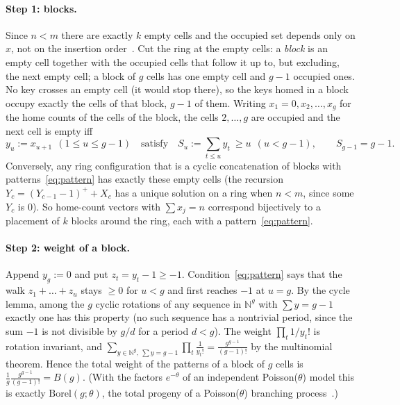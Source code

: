 \documentclass[11pt,a4paper]{article}
\theoremstyle{definition}
\theoremstyle{remark}
\newcommand{\N}{\mathbb{N}}
\begin{document}
\paragraph{Step 1: blocks.} Since $n<m$ there are exactly $k$ empty cells and the occupied set depends only on $x$, not on the insertion order~\cite{konheim1966}. Cut the ring at the empty cells: a \emph{block} is an empty cell together with the occupied cells that follow it up to, but excluding, the next empty cell; a block of $g$ cells has one empty cell and $g-1$ occupied ones. No key crosses an empty cell (it would stop there), so the keys homed in a block occupy exactly the cells of that block, $g-1$ of them. Writing $x_1=0,x_2,\dots,x_g$ for the home counts of the cells of the block, the cells $2,\dots,g$ are occupied and the next cell is empty iff
\begin{equation}\label{eq:pattern}
y_u:=x_{u+1}\ \ (1\le u\le g-1)\quad\text{satisfy}\quad S_u:=\sum_{t\le u}y_t\ \ge u\ \ (u<g-1),\qquad S_{g-1}=g-1 .
\end{equation}
Conversely, any ring configuration that is a cyclic concatenation of blocks with patterns~\eqref{eq:pattern} has exactly these empty cells (the recursion $Y_c=(Y_{c-1}-1)^++X_c$ has a unique solution on a ring when $n<m$, since some $Y_c$ is $0$). So home-count vectors with $\sum x_j=n$ correspond bijectively to a placement of $k$ blocks around the ring, each with a pattern~\eqref{eq:pattern}.

\paragraph{Step 2: weight of a block.} Append $y_g:=0$ and put $z_t=y_t-1\ge-1$. Condition~\eqref{eq:pattern} says that the walk $z_1+\dots+z_u$ stays $\ge0$ for $u<g$ and first reaches $-1$ at $u=g$. By the cycle lemma, among the $g$ cyclic rotations of any sequence in $\N^g$ with $\sum y=g-1$ exactly one has this property (no such sequence has a nontrivial period, since the sum $-1$ is not divisible by $g/d$ for a period $d<g$). The weight $\prod_t 1/y_t!$ is rotation invariant, and $\sum_{y\in\N^g,\ \sum y=g-1}\prod_t\frac1{y_t!}=\frac{g^{g-1}}{(g-1)!}$ by the multinomial theorem. Hence the total weight of the patterns of a block of $g$ cells is $\frac1g\frac{g^{g-1}}{(g-1)!}=B(g)$. (With the factors $e^{-\theta}$ of an independent Poisson($\theta$) model this is exactly $\mathrm{Borel}(g;\theta)$, the total progeny of a Poisson($\theta$) branching process~\cite{dwass1969}.)
\end{document}
